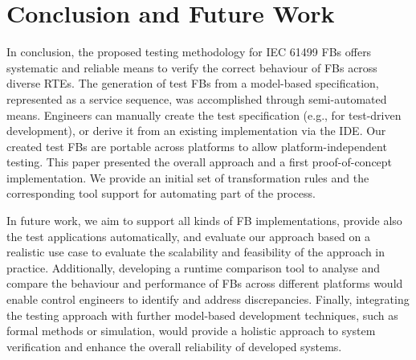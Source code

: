 \section{Conclusion and Future Work}
\label{sec::conclusions}
In conclusion, the proposed testing methodology for IEC 61499 FBs offers systematic and reliable means to verify the correct behaviour of FBs across diverse RTEs. The generation of test FBs from a model-based specification, represented as a service sequence, was accomplished through semi-automated means. Engineers can manually create the test specification (e.g., for test-driven development), or derive it from an existing implementation via the IDE. Our created test FBs are portable across platforms to allow platform-independent testing. This paper presented the overall approach and a first proof-of-concept implementation. We provide an initial set of transformation rules and the corresponding tool support for automating part of the process.

In future work, we aim to support all kinds of FB implementations, provide also the test applications automatically, and evaluate our approach based on a realistic use case to evaluate the scalability and feasibility of the approach in practice. Additionally, developing a runtime comparison tool to analyse and compare the behaviour and performance of FBs across different platforms would enable control engineers to identify and address discrepancies. Finally, integrating the testing approach with further model-based development techniques, such as formal methods or simulation, would provide a holistic approach to system verification and enhance the overall reliability of developed systems.


